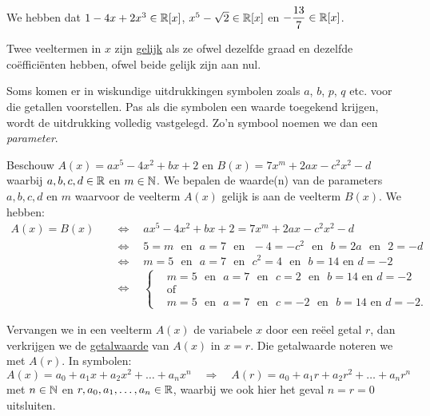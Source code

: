 \documentclass{ximera}
\begin{document}
\begin{example} 
We hebben dat $1-4x+2x^3 \in \mathbb{R}[x]$, $x^5-\sqrt{2} \in \mathbb{R}[x]$ en $\displaystyle -\frac{13}{7} \in \mathbb{R}[x]$.   
\end{example} 

Twee veeltermen in $x$ zijn \underline{gelijk} als ze ofwel dezelfde graad en dezelfde co\"effici\"enten hebben, ofwel beide gelijk zijn aan nul. 

Soms komen er in wiskundige uitdrukkingen symbolen zoals $a$, $b$, $p$, $q$ etc. voor die getallen voorstellen. Pas als die symbolen een waarde toegekend krijgen, wordt de uitdrukking volledig vastgelegd. Zo'n symbool noemen we dan een {\em parameter}. 

\begin{example} 
Beschouw $A(x) = ax^5 - 4x^2 + bx + 2$ en $B(x) = 7x^m + 2ax - c^2x^2 - d$ waarbij $a,b,c,d \in \mathbb{R}$ en $m \in \mathbb{N}$. We bepalen de waarde(n) van de parameters $a,b,c,d$ en $m$ waarvoor de veelterm $A(x)$ gelijk is aan de veelterm $B(x)$. We hebben: 
\begin{align*}
A(x) = B(x) \quad 
& \Leftrightarrow \quad ax^5 - 4x^2 + bx + 2 = 7x^m + 2ax - c^2x^2 - d \\
& \Leftrightarrow \quad 5 = m \,\,\text{ en }\,\, a = 7 \,\,\text{ en }\,\, -4 = -c^2 \,\,\text{ en }\,\, b = 2a \,\,\text{ en }\,\, 2 = -d \\
& \Leftrightarrow \quad m=5 \,\,\text{ en }\,\, a = 7 \,\,\text{ en }\,\, c^2 = 4 \,\,\text{ en }\,\, b = 14 \text{ en } d = -2 \\
& \Leftrightarrow \quad 
\left\{
\begin{aligned}
& m=5 \,\,\text{ en }\,\, a = 7 \,\,\text{ en }\,\, c = 2 \,\,\text{ en }\,\, b = 14 \text{ en } d = -2 \\
& \text{of} \\
& m=5 \,\,\text{ en }\,\, a = 7 \,\,\text{ en }\,\, c = -2 \,\,\text{ en }\,\, b = 14 \text{ en } d = -2.
\end{aligned}
\right.
\end{align*}
\end{example} 

Vervangen we in een veelterm $A(x)$ de variabele $x$ door een re\"eel getal $r$, dan verkrijgen we de \underline{getalwaarde} van $A(x)$ in $x = r$. Die getalwaarde noteren we met $A(r)$. In symbolen:
\[
A(x) = a_0 + a_1x + a_2x^2 + \dots + a_n x^n \quad 
\Rightarrow
\quad A(r) = a_0 + a_1 r + a_2r^2 + \dots + a_n r^n
\]
met $n \in \mathbb{N}$ en $r, a_0, a_1, \ldots, a_n \in \mathbb{R}$, waarbij we ook hier het geval $n = r = 0$ uitsluiten. %
\end{document}
